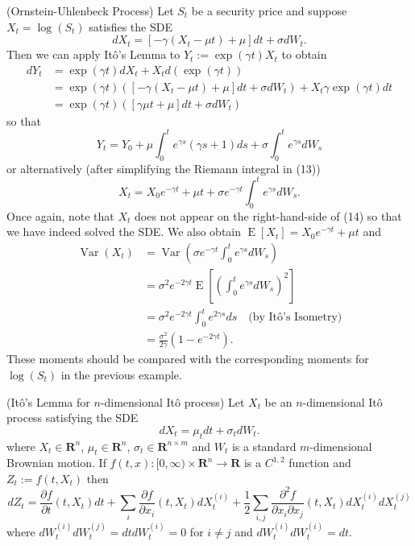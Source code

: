 \begin{example} (Ornstein-Uhlenbeck Process)
Let $S_t$ be a security price and suppose $X_t=\log(S_t)$ satisfies the SDE
\[dX_t = [-\gamma(X_t-\mu t)+\mu] dt + \sigma dW_t.\]
Then we can apply It\^o's Lemma to $Y_t:=\exp(\gamma t)X_t$ to obtain
\begin{align*}
dY_t &= \exp(\gamma t) dX_t + X_t d(\exp(\gamma t)) \\
&= \exp(\gamma t)\left([-\gamma(X_t-\mu t)+\mu] dt + \sigma dW_t\right) + X_t \gamma \exp(\gamma t) dt \\
&= \exp(\gamma t)\left([\gamma\mu t+\mu] dt + \sigma dW_t\right)
\end{align*}
so that
\[Y_t = Y_0 + \mu\int_0^t e^{\gamma s}(\gamma s+1) ds + \sigma\int_0^t e^{\gamma s} dW_s \tag{13}\]
or alternatively (after simplifying the Riemann integral in (13))
\[X_t = X_0 e^{-\gamma t} + \mu t + \sigma e^{-\gamma t} \int_0^t e^{\gamma s} dW_s. \tag{14}\]
Once again, note that $X_t$ does not appear on the right-hand-side of (14) so that we have indeed solved the SDE. We also obtain $\operatorname{E}[X_t]=X_0 e^{-\gamma t} + \mu t$ and
\begin{align*}
\operatorname{Var}(X_t) &= \operatorname{Var}\left(\sigma e^{-\gamma t}\int_0^t e^{\gamma s} dW_s\right) \\
&= \sigma^2 e^{-2\gamma t} \operatorname{E}\left[\left(\int_0^t e^{\gamma s} dW_s\right)^2\right] \\
&= \sigma^2 e^{-2\gamma t} \int_0^t e^{2\gamma s} ds \quad \text{(by It\^o's Isometry)} \\
&= \frac{\sigma^2}{2\gamma} \left(1-e^{-2\gamma t}\right). \tag{15}
\end{align*}
These moments should be compared with the corresponding moments for $\log(S_t)$ in the previous example.
\end{example}

\begin{theorem} (It\^o's Lemma for $n$-dimensional It\^o process)
Let $X_t$ be an $n$-dimensional It\^o process satisfying the SDE
\[dX_t = \mu_t dt + \sigma_t dW_t.\]
where $X_t\in\mathbf{R}^n$, $\mu_t\in\mathbf{R}^n$, $\sigma_t\in\mathbf{R}^{n\times m}$ and $W_t$ is a standard $m$-dimensional Brownian motion. If $f(t,x):[0,\infty)\times\mathbf{R}^n\to\mathbf{R}$ is a $C^{1,2}$ function and $Z_t:=f(t,X_t)$ then
\[dZ_t = \frac{\partial f}{\partial t}(t,X_t) dt + \sum_i \frac{\partial f}{\partial x_i}(t,X_t) dX^{(i)}_t + \frac{1}{2}\sum_{i,j} \frac{\partial^2 f}{\partial x_i \partial x_j}(t,X_t) dX^{(i)}_t dX^{(j)}_t\]
where $dW^{(i)}_t dW^{(j)}_t = dt dW^{(i)}_t=0$ for $i\neq j$ and $dW^{(i)}_t dW^{(i)}_t=dt$.
\end{theorem}


